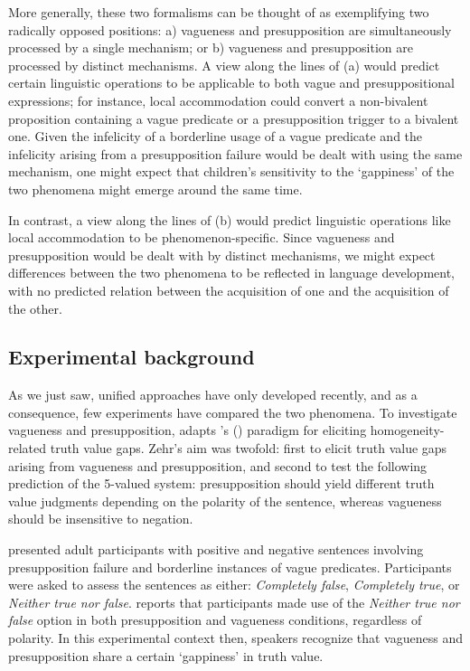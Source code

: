\documentclass[12pt, letterpaper]{article}
\newcommand\posscite[1]{\citeauthor{#1}'s (\citeyear{#1})}
\begin{document}
{More generally, these two formalisms can be thought of as exemplifying two radically opposed positions: a) vagueness and presupposition are simultaneously processed by a single mechanism; or b) vagueness and presupposition are processed by distinct mechanisms. A view along the lines of (a) would predict certain linguistic operations to be applicable to both vague and presuppositional expressions; for instance, local accommodation could convert a non-bivalent proposition containing a vague predicate or a presupposition trigger to a bivalent one. Given the infelicity of a borderline usage of a vague predicate and the infelicity arising from a presupposition failure would be dealt with using the same mechanism, one might expect that children's sensitivity to the `gappiness' of the two phenomena might emerge around the same time. 

In contrast, a view along the lines of (b) would predict linguistic operations like local accommodation to be phenomenon-specific. Since vagueness and presupposition would be dealt with by distinct mechanisms, we might expect differences between the two phenomena to be reflected in language development, with no predicted relation between the acquisition of one and the acquisition of the other.

\subsection{Experimental background}
 
As we just saw, unified approaches have only developed recently, and as a consequence, few experiments have compared the two phenomena. To investigate vagueness and presupposition, \cite{Zehr:2014} adapts \posscite{Kriz:2015} paradigm for eliciting homogeneity-related truth value gaps. Zehr's aim was twofold: first to elicit truth value gaps arising from vagueness and presupposition, and second to test the following prediction of the 5-valued system: presupposition should yield different truth value judgments depending on the polarity of the sentence, whereas vagueness should be insensitive to negation.

\cite{Zehr:2014} presented adult participants with positive and negative sentences involving presupposition failure and borderline instances of vague predicates. Participants were asked to assess the sentences as either: \textit{Completely false}, \textit{Completely true}, or \textit{Neither true nor false}. \cite{Zehr2015:poster} reports that participants made use of the \textit{Neither true nor false} option in both presupposition and vagueness conditions, regardless of polarity. In this experimental context then, speakers recognize that vagueness and presupposition share a certain `gappiness' in truth value.

}
\end{document}

